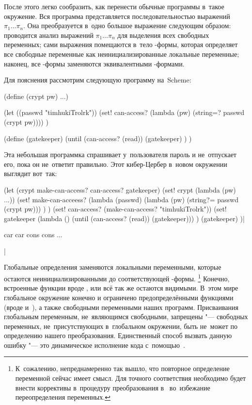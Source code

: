 После этого легко сообразить, как перенести обычные программы в~такое окружение.
Вся программа представляется последовательностью выражений $\pi_1\dots\pi_n$.
Она преобразуется в~одно большое выражение следующим образом: проводится анализ
выражений $\pi_1\dots\pi_n$ для выделения всех свободных переменных; сами
выражения помещаются в~тело -формы, которая определяет все свободные
переменные как неинициализированные локальные переменные; наконец, все
-формы заменяются эквивалентными -формами.

Для пояснения рассмотрим следующую программу на~Scheme:

\begin{code:lisp}
(define (crypt pw) ...)

(let ((passwd "timhukiTrolrk"))
  (set! can-access? (lambda (pw) (string=? passwd (crypt pw)))) )

(define (gatekeeper)
  (until (can-access? (read))
         (gatekeeper) ) )
\end{code:lisp}

Эта небольшая программка спрашивает у~пользователя пароль и не~отпускает его,
пока он не~ответит правильно. Этот кибер-Цербер в~новом окружении выглядит
вот~так:

\begin{code:lisp}
(let (crypt make-can-access? can-access? gatekeeper)
  (set! crypt (lambda (pw) ...))
  (set! make-can-acceess?
        (lambda (passwd)
          (lambda (pw) (string?= passwd (crypt pw))) ) )
  (set! can-access? (make-can-access? "timhukiTrolrk"))
  (set! gatekeeper
        (lambda () (until (can-access? (read)) (gatekeeper))) )
  (gatekeeper) )|\begin{where}
                 \- car {\eq} car
                 \- cons {\eq} cons
                 \- ...
                 \end{where}|
\end{code:lisp}

Глобальные определения заменяются локальными переменными, которые остаются
неинициализированными до соответствующей -формы.%
\footnote*{К~сожалению, непреднамеренно так вышло, что повторное определение
переменной сейчас имеет смысл. Для точного соответствия необходимо будет внести
коррективы в~процедуру преобразования  в~ во~избежание
переопределения переменных.} Конечно, встроенные функции вроде ,
 или  всё так же остаются видимыми. В~этом мире
глобальное окружение конечно и ограничено предопределёнными функциями (вроде
 и~), а также свободными переменными наших программ.
Присваивания глобальным переменным, не~являющимся свободными, запрещены "---
свободных переменных, не~присутствующих в~глобальном окружении, быть не~может
по определению нашего преобразования. Единственный способ вызвать данную ошибку
"--- это динамическое исполнение кода с~помощью~.



